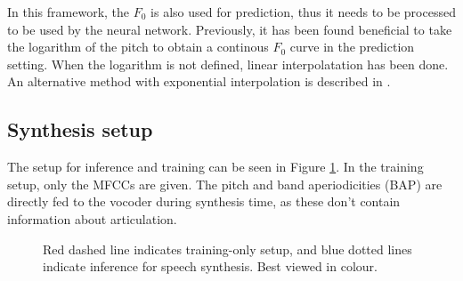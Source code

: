 \documentclass[a4paper]{article}
\begin{document}
In this framework, the \( F_0 \) is also used for prediction, thus it
needs to be processed to be used by the neural network. 
Previously, it has been found beneficial to take the logarithm of the
pitch to obtain a continous \( F_0 \) curve in the prediction setting.
When the logarithm is not defined, linear  interpolatation has been done. \cite{Gonzalez2017}
An alternative method with exponential interpolation is described in \cite{Chen1997}.

\subsection{Synthesis setup}

The setup for inference and training can be seen in Figure \ref{fig:structure}.
In the training setup, only the MFCCs are given.
The pitch and band aperiodicities (BAP) are directly fed to the vocoder
during synthesis time, as these don't contain information about articulation. 

\begin{figure}
  \label{fig:structure}
  \vspace{0.5em}
    \caption{Red dashed line indicates training-only setup, and blue dotted lines indicate inference for speech synthesis. Best viewed in colour.}
\end{figure}
\end{document}
